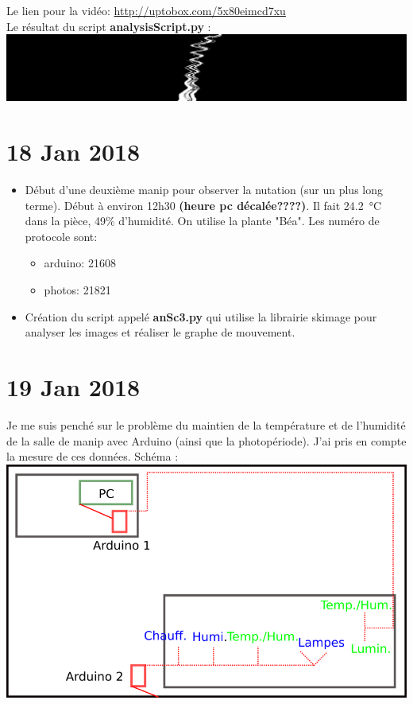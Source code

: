 \documentclass[10pt,a4paper]{article}
\begin{document}
Le lien pour la vidéo: \url{http://uptobox.com/5x80eimcd7xu}\\

Le résultat du script \textbf{analysisScript.py} :\\
\includegraphics[width = \linewidth]{imTLBWv1.jpg}

\section{18 Jan 2018}
\begin{itemize}
    \item Début d'une deuxième manip pour observer la nutation (sur un plus long terme). Début à environ 12h30 \textbf{(heure pc décalée????)}. Il fait \SI{24.2}{\celsius} dans la pièce, 49\% d'humidité. On utilise la plante "Béa". Les numéro de protocole sont:
    \begin{itemize}
        \item arduino: 21608
        \item photos: 21821
    \end{itemize}
    \item Création du script appelé \textbf{anSc3.py} qui utilise la librairie skimage pour analyser les images et réaliser le graphe de mouvement.

\end{itemize}

\section{19 Jan 2018}
Je me suis penché sur le problème du maintien de la température et de l'humidité de la salle de manip avec Arduino (ainsi que la photopériode). J'ai pris en compte la mesure de ces données. Schéma :\\
\includegraphics[width=0.6\linewidth]{schema_Arduino.png}
\end{document}
